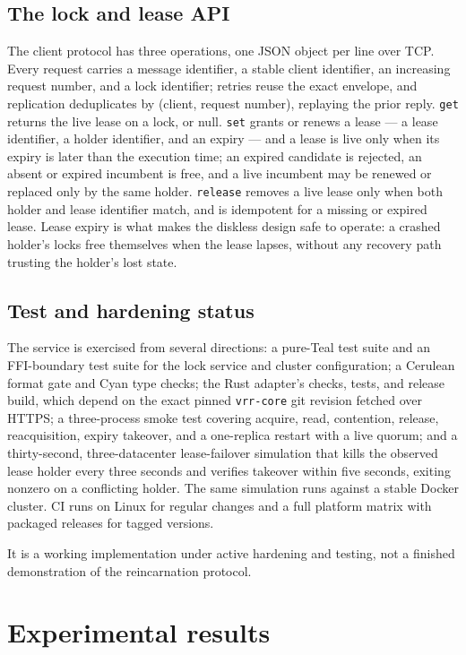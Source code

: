 \documentclass[10pt,journal,letterpaper]{IEEEtran}
\newcommand{\code}[1]{\texttt{\small #1}}
\begin{document}
\subsection{The lock and lease API}
The client protocol has three operations, one JSON object per line over TCP.
Every request carries a message identifier, a stable client identifier, an
increasing request number, and a lock identifier; retries reuse the exact
envelope, and replication deduplicates by (client, request number), replaying
the prior reply.
\code{get} returns the live lease on a lock, or null.
\code{set} grants or renews a lease --- a lease identifier, a holder
identifier, and an expiry --- and a lease is live only when its expiry is
later than the execution time; an expired candidate is rejected, an absent or
expired incumbent is free, and a live incumbent may be renewed or replaced
only by the same holder.
\code{release} removes a live lease only when both holder and lease
identifier match, and is idempotent for a missing or expired lease. Lease
expiry is what makes the diskless design safe to operate: a crashed holder's
locks free themselves when the lease lapses, without any recovery path
trusting the holder's lost state.

\subsection{Test and hardening status}
The service is exercised from several directions: a pure-Teal test suite and
an FFI-boundary test suite for the lock service and cluster configuration; a
Cerulean format gate and Cyan type checks; the Rust adapter's checks, tests,
and release build, which depend on the exact pinned \code{vrr-core} git
revision fetched over HTTPS; a three-process smoke test covering acquire,
read, contention, release, reacquisition, expiry takeover, and a one-replica
restart with a live quorum; and a thirty-second, three-datacenter
lease-failover simulation that kills the observed lease holder every three
seconds and verifies takeover within five seconds, exiting nonzero on a
conflicting holder. The same simulation runs against a stable Docker
cluster. CI runs on Linux for regular changes and a full platform matrix
with packaged releases for tagged versions.

It is a working implementation under active hardening and testing, not a
finished demonstration of the reincarnation protocol.

\section{Experimental results}\label{sec:experiments}
\end{document}
